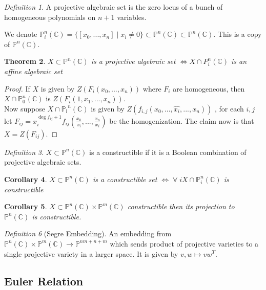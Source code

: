 \documentclass[12pt]{article}
\newtheorem{theorem}{Theorem}[section]
\newtheorem{corollary}[theorem]{Corollary}
\theoremstyle{remark}
\newtheorem{definition}[theorem]{Definition}
\newcommand{\C}{\mathbb{C}}
\begin{document}
\begin{definition}
A projective algebraic set is the zero locus of a bunch of homogeneous polynomials on $n+1$ variables.
\end{definition}

We denote $\mathbb{P}_i^n(\C) = \{ [x_0,...,x_n] \; | \; x_i \neq 0  \} \subset \mathbb{P}^n(\C) \subset \mathbb{P}^n(\C)$. This is a copy of $\mathbb{P}^n(\C)$.

\begin{theorem}
$X \subset \mathbb{P}^n(\C)$ is a projective algebraic set $\iff X \cap P_i^n(\C)$ is an affine algebraic set  

\end{theorem} 

\begin{proof}
If $X$ is given by $Z(F_i(x_0,...,x_n))$ where $F_i$ are homogeneous, then $X \cap \mathbb{P}_0^n(\C)$ is $Z(F_i(1,x_1,...,x_n))$.\\

Now suppose $X \cap \mathbb{P_i}^n(\C)$ is given by $Z(f_{i,j}(x_0,...,\hat{x_i},...,x_n))$ , for each $i,j$ let $F_{ij}=x_i^{\deg f_{ij}+1} f_{ij}(\frac{x_0}{x_i},...,\frac{x_n}{x_i}) $ be the homogenization. The claim now is that $X = Z(F_{ij})$.
\end{proof}

\begin{definition}
$X \subset \mathbb{P}^n(\C)$ is a constructible if it is a Boolean combination of projective algebraic sets.
\end{definition}

\begin{corollary}
$X \subset \mathbb{P}^n(\C)$ is a constructible set $\iff \; \forall \; i X \cap \mathbb{P}_i^n(\C)$ is constructible
\end{corollary}


\begin{corollary}
$X \subset \mathbb{P}^n(\C) \times \mathbb{P}^m(\C)$ constructible then its projection to $\mathbb{P}^n(\C)$ is constructible.
\end{corollary}


\begin{definition}[Segre Embedding]
An embedding from $\mathbb{P}^n(\C) \times \mathbb{P}^m(\C) \rightarrow \mathbb{P}^{nm+n+m}$ which sends product of projective varieties to a single projective variety in a larger space. It is given by $v,w \mapsto vw^T$.
\end{definition}

\subsection{Euler Relation}
\end{document}
